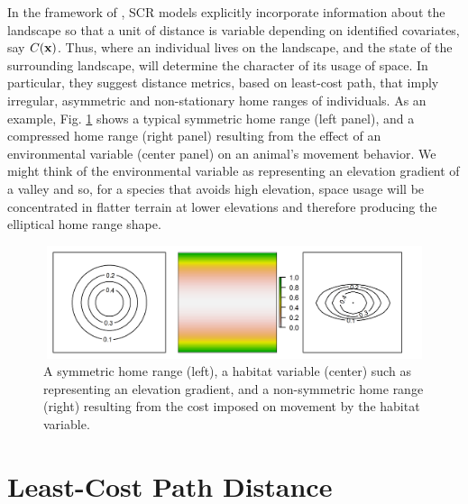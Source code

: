 In the framework of \citet{royle_etal:2012ecol}, SCR models explicitly
incorporate information about the landscape so that a unit of distance
is variable depending on identified covariates, say
$C({\bf x})$. %
Thus, where an individual lives on the landscape, and the state of the
surrounding landscape, will determine the character of its usage of
space. In particular, they suggest distance metrics, based on
least-cost path, that imply irregular, asymmetric and non-stationary
home ranges of individuals. As an example, Fig. \ref{fig.distort}
shows a typical symmetric home range (left panel), and a compressed
home range (right panel) resulting from the effect of an environmental
variable (center panel) on an animal's movement behavior. We might
think of the environmental variable as representing an elevation
gradient of a valley and so, for a species that avoids high elevation,
space usage will be concentrated in flatter terrain at lower
elevations and therefore producing the elliptical home range shape.


\begin{figure}[h]
\centering
\includegraphics[width=5in,height=1.3in]{Ch12-EcolDist/figs/distort}
\caption{A symmetric home range (left), a habitat variable (center)
  such as representing an elevation gradient,
  and a non-symmetric home range (right) resulting from the cost imposed on
  movement by the habitat variable.}
\label{fig.distort}
\end{figure}


\section{Least-Cost Path Distance}

